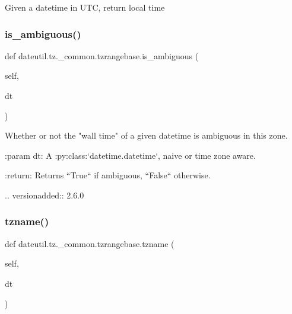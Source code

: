 \begin{DoxyVerb}Given a datetime in UTC, return local time \end{DoxyVerb}
 \mbox{\label{classdateutil_1_1tz_1_1__common_1_1tzrangebase_a5a73d01b931cf74cb138dc443be487c6}} 
\subsubsection{\texorpdfstring{is\+\_\+ambiguous()}{is\_ambiguous()}}
{\footnotesize\ttfamily def dateutil.\+tz.\+\_\+common.\+tzrangebase.\+is\+\_\+ambiguous (\begin{DoxyParamCaption}\item[{}]{self,  }\item[{}]{dt }\end{DoxyParamCaption})}

\begin{DoxyVerb}Whether or not the "wall time" of a given datetime is ambiguous in this
zone.

:param dt:
    A :py:class:`datetime.datetime`, naive or time zone aware.


:return:
    Returns ``True`` if ambiguous, ``False`` otherwise.

.. versionadded:: 2.6.0
\end{DoxyVerb}
 \mbox{\label{classdateutil_1_1tz_1_1__common_1_1tzrangebase_a5ca95f20b60e1e9b43479ffaff55653f}} 
\subsubsection{\texorpdfstring{tzname()}{tzname()}}
{\footnotesize\ttfamily def dateutil.\+tz.\+\_\+common.\+tzrangebase.\+tzname (\begin{DoxyParamCaption}\item[{}]{self,  }\item[{}]{dt }\end{DoxyParamCaption})}

